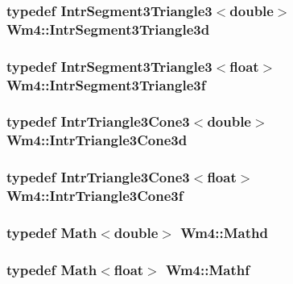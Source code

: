 \subsubsection{\setlength{\rightskip}{0pt plus 5cm}typedef {\bf Intr\-Segment3Triangle3}$<$double$>$ {\bf Wm4::Intr\-Segment3Triangle3d}}\label{namespaceWm4_797bfd6561ce2a5a07affad5f11f5e7b}


\subsubsection{\setlength{\rightskip}{0pt plus 5cm}typedef {\bf Intr\-Segment3Triangle3}$<$float$>$ {\bf Wm4::Intr\-Segment3Triangle3f}}\label{namespaceWm4_bc4804d8fd796cdc79768f4e6ef4457a}


\subsubsection{\setlength{\rightskip}{0pt plus 5cm}typedef {\bf Intr\-Triangle3Cone3}$<$double$>$ {\bf Wm4::Intr\-Triangle3Cone3d}}\label{namespaceWm4_816e71b773bc28ff4bcacec82ab49ebb}


\subsubsection{\setlength{\rightskip}{0pt plus 5cm}typedef {\bf Intr\-Triangle3Cone3}$<$float$>$ {\bf Wm4::Intr\-Triangle3Cone3f}}\label{namespaceWm4_a349038cb140a341016302f1bbeae8fb}


\subsubsection{\setlength{\rightskip}{0pt plus 5cm}typedef {\bf Math}$<$double$>$ {\bf Wm4::Mathd}}\label{namespaceWm4_faa01b266f012e63ec357036378b4bbd}


\subsubsection{\setlength{\rightskip}{0pt plus 5cm}typedef {\bf Math}$<$float$>$ {\bf Wm4::Mathf}}\label{namespaceWm4_de76e69edb4f2f89a3d2346a4817c4c5}


